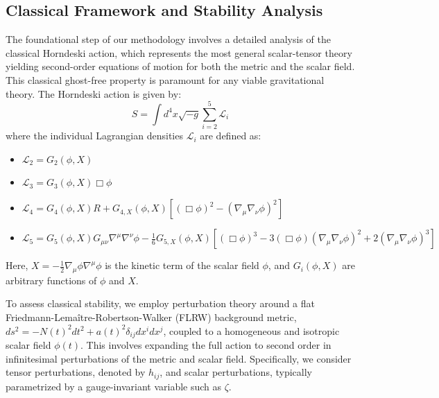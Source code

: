 \documentclass[twocolumn]{aastex631}
\begin{document}
\subsection{Classical Framework and Stability Analysis}
The foundational step of our methodology involves a detailed analysis of the classical Horndeski action, which represents the most general scalar-tensor theory yielding second-order equations of motion for both the metric and the scalar field. This classical ghost-free property is paramount for any viable gravitational theory. The Horndeski action is given by:
\begin{equation}
S = \int d^4x \sqrt{-g} \sum_{i=2}^{5} \mathcal{L}_i
\end{equation}
where the individual Lagrangian densities $\mathcal{L}_i$ are defined as:
\begin{itemize}
    \item $\mathcal{L}_2 = G_2(\phi, X)$
    \item $\mathcal{L}_3 = G_3(\phi, X) \Box\phi$
    \item $\mathcal{L}_4 = G_4(\phi, X) R + G_{4,X}(\phi, X) [(\Box\phi)^2 - (\nabla_\mu\nabla_\nu\phi)^2]$
    \item $\mathcal{L}_5 = G_5(\phi, X) G_{\mu\nu}\nabla^\mu\nabla^\nu\phi - \frac{1}{6}G_{5,X}(\phi, X) [(\Box\phi)^3 - 3(\Box\phi)(\nabla_\mu\nabla_\nu\phi)^2 + 2(\nabla_\mu\nabla_\nu\phi)^3]$
\end{itemize}
Here, $X = -\frac{1}{2}\nabla_\mu\phi \nabla^\mu\phi$ is the kinetic term of the scalar field $\phi$, and $G_i(\phi, X)$ are arbitrary functions of $\phi$ and $X$.

To assess classical stability, we employ perturbation theory around a flat Friedmann-Lemaître-Robertson-Walker (FLRW) background metric, $ds^2 = -N(t)^2 dt^2 + a(t)^2 \delta_{ij} dx^i dx^j$, coupled to a homogeneous and isotropic scalar field $\phi(t)$. This involves expanding the full action to second order in infinitesimal perturbations of the metric and scalar field. Specifically, we consider tensor perturbations, denoted by $h_{ij}$, and scalar perturbations, typically parametrized by a gauge-invariant variable such as $\zeta$.
\end{document}
